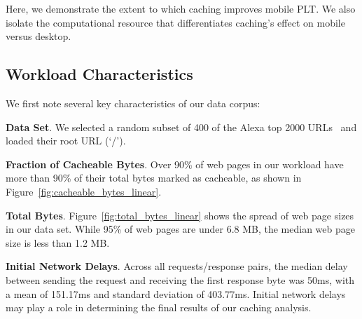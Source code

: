 Here, we demonstrate the extent to which caching improves mobile PLT.
We also isolate the computational resource that differentiates caching's effect on mobile versus desktop.

\subsection{Workload Characteristics}
We first note several key characteristics of our data corpus:

\textbf{Data Set}. We selected a random subset of 400 of the Alexa top 2000 URLs~\cite{alexa} and loaded their root URL (`/').

\textbf{Fraction of Cacheable Bytes}. Over 90\% of web pages in our workload have more than 90\% of their total bytes marked as cacheable, as shown in Figure~\ref{fig:cacheable_bytes_linear}. %

\textbf{Total Bytes}. Figure~\ref{fig:total_bytes_linear} shows the spread of web page sizes in our data set. While 95\% of web pages are under 6.8 MB, the median web page size is less than 1.2 MB.

\textbf{Initial Network Delays}. Across all requests/response pairs, the median delay between sending the request and receiving the first response byte was 50ms, with a mean of 151.17ms and standard deviation of 403.77ms.
Initial network delays may play a role in determining the final results of our caching analysis. 

